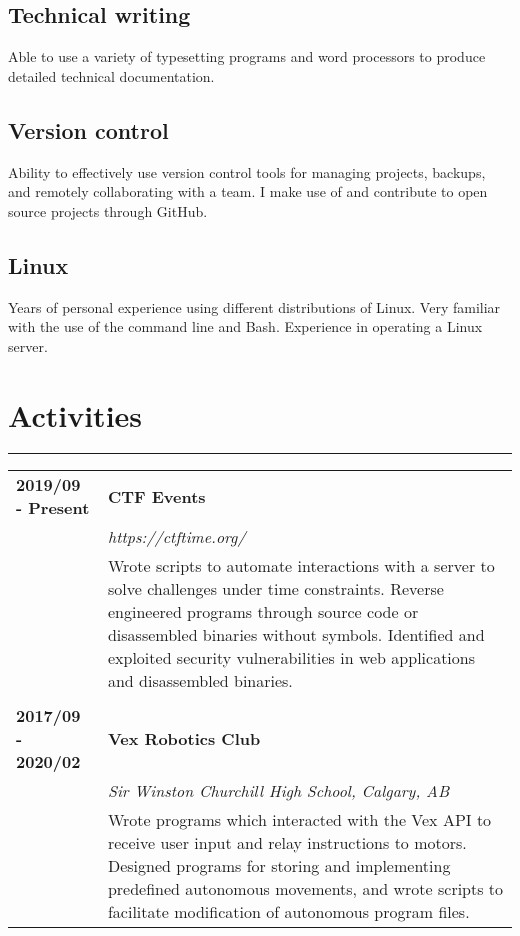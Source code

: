 \documentclass[letterpaper]{article}
\newcommand{\horizontalLine}{%
    \rule{\textwidth}{0.2pt}
    \vspace{1ex}
}
\begin{document}
        \subsection*{Technical writing}

        Able to use a variety of typesetting programs and word processors to produce detailed technical documentation.

        \subsection*{Version control}
        Ability to effectively use version control tools for managing projects, backups, and remotely collaborating with a team.
        I make use of and contribute to open source projects through GitHub.

        \subsection*{Linux}

        Years of personal experience using different distributions of Linux.
        Very familiar with the use of the command line and Bash.
        Experience in operating a Linux server.

    \section*{Activities}

        \horizontalLine

        \begin{tabular}{p{} p{}} 
            \textbf{2019/09 - Present} & \large\textbf{CTF Events} \\
            & \emph{https://ctftime.org/} \\
            & Wrote scripts to automate interactions with a server to solve challenges under time constraints.
            Reverse engineered programs through source code or disassembled binaries without symbols.
            Identified and exploited security vulnerabilities in web applications and disassembled binaries. \\
            \\
            \textbf{2017/09 - 2020/02} & \large\textbf{Vex Robotics Club} \\
            & \emph{Sir Winston Churchill High School, Calgary, AB} \\
            & Wrote programs which interacted with the Vex API to receive user input and relay instructions to motors.
            Designed programs for storing and implementing predefined autonomous movements, and wrote scripts to facilitate modification of autonomous program files. \\
        \end{tabular}
\end{document}
